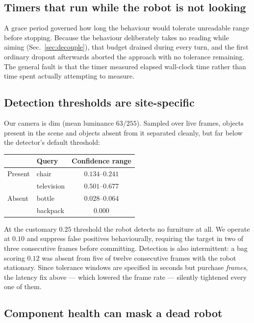 \documentclass[conference]{IEEEtran}
\begin{document}
\subsection{Timers that run while the robot is not looking}

A grace period governed how long the behaviour would tolerate unreadable range
before stopping. Because the behaviour deliberately takes no reading while
aiming (Sec.~\ref{sec:decouple}), that budget drained during every turn, and the
first ordinary dropout afterwards aborted the approach with no tolerance
remaining. The general fault is that the timer measured elapsed wall-clock time
rather than time spent actually attempting to measure.

\subsection{Detection thresholds are site-specific}

Our camera is dim (mean luminance $63/255$). Sampled over live frames, objects
present in the scene and objects absent from it separated cleanly, but far below
the detector's default threshold:

\begin{center}
\begin{tabular}{llc}
\toprule
& Query & Confidence range \\
\midrule
Present & chair & $0.134$--$0.241$ \\
        & television & $0.501$--$0.677$ \\
Absent  & bottle & $0.028$--$0.064$ \\
        & backpack & $0.000$ \\
\bottomrule
\end{tabular}
\end{center}

At the customary $0.25$ threshold the robot detects no furniture at all. We
operate at $0.10$ and suppress false positives behaviourally, requiring the
target in two of three consecutive frames before committing. Detection is also
intermittent: a bag scoring $0.12$ was absent from five of twelve consecutive
frames with the robot stationary. Since tolerance windows are specified in
seconds but purchase \emph{frames}, the latency fix above --- which lowered the
frame rate --- silently tightened every one of them.

\subsection{Component health can mask a dead robot}
\end{document}
